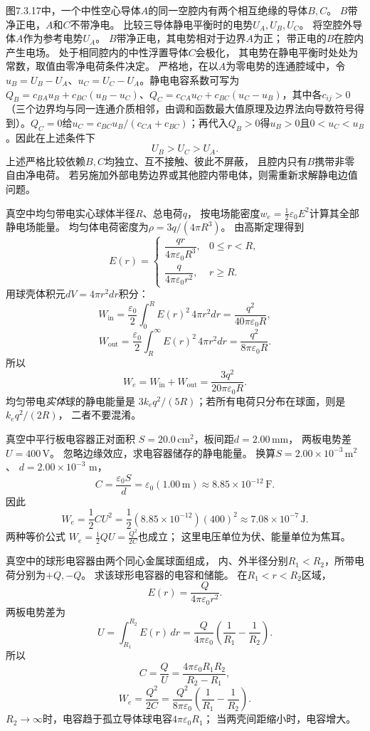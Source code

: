 \problemtext 图7.3.17中，一个中性空心导体$A$的同一空腔内有两个相互绝缘的导体$B,C$。
$B$带净正电，$A$和$C$不带净电。
比较三导体静电平衡时的电势$U_A,U_B,U_C$。
\workings
将空腔外导体$A$作为参考电势$U_A$。
$B$带净正电，其电势相对于边界$A$为正；
带正电的$B$在腔内产生电场。
处于相同腔内的中性浮置导体$C$会极化，
其电势在静电平衡时处处为常数，取值由零净电荷条件决定。
严格地，在以$A$为零电势的连通腔域中，令$u_B=U_B-U_A$、$u_C=U_C-U_A$。静电电容系数可写为$Q_B=c_{BA}u_B+c_{BC}(u_B-u_C)$、$Q_C=c_{CA}u_C+c_{BC}(u_C-u_B)$，其中各$c_{ij}>0$（三个边界均与同一连通介质相邻，由调和函数最大值原理及边界法向导数符号得到）。$Q_C=0$给$u_C=c_{BC}u_B/(c_{CA}+c_{BC})$；再代入$Q_B>0$得$u_B>0$且$0<u_C<u_B$。因此在上述条件下
\[
\boxed{U_B>U_C>U_A}.
\]
\crosscheck 上述严格比较依赖$B,C$均独立、互不接触、彼此不屏蔽，
且腔内只有$B$携带非零自由净电荷。
若另施加外部电势边界或其他腔内带电体，则需重新求解静电边值问题。

\problemtext 真空中均匀带电实心球体半径$R$、总电荷$q$，
按电场能密度$w_e=\tfrac12\varepsilon_0E^2$计算其全部静电场能量。
\workings
均匀体电荷密度为$\rho=3q/(4\pi R^3)$。
由高斯定理得到
\[
E(r)=
\begin{cases}
\dfrac{qr}{4\pi\varepsilon_0R^3},&0\le r<R,\\
\dfrac{q}{4\pi\varepsilon_0r^2},&r\ge R.
\end{cases}
\]
用球壳体积元$dV=4\pi r^2dr$积分：
\[
W_{\mathrm{in}}=\frac{\varepsilon_0}{2}
\int_0^R E(r)^2\,4\pi r^2dr
=\frac{q^2}{40\pi\varepsilon_0R},
\]
\[
W_{\mathrm{out}}=\frac{\varepsilon_0}{2}
\int_R^\infty E(r)^2\,4\pi r^2dr
=\frac{q^2}{8\pi\varepsilon_0R}.
\]
所以
\[
\boxed{W_e=W_{\mathrm{in}}+W_{\mathrm{out}}
=\frac{3q^2}{20\pi\varepsilon_0R}}.
\]
\crosscheck 均匀带电\emph{实体}球的静电能量是
$3k_eq^2/(5R)$；若所有电荷只分布在球面，则是$k_eq^2/(2R)$，
二者不要混淆。

\problemtext 真空中平行板电容器正对面积
$S=20.0\,\mathrm{cm^2}$，板间距$d=2.00\,\mathrm{mm}$，
两板电势差$U=400\,\mathrm V$。
忽略边缘效应，求电容器储存的静电能量。
\workings
换算$S=2.00\times10^{-3}\,\mathrm{m^2}$、
$d=2.00\times10^{-3}$ m，
\[
C=\frac{\varepsilon_0S}{d}
=\varepsilon_0(1.00\,\mathrm m)\approx8.85\times10^{-12}\,\mathrm F.
\]
因此
\[
\boxed{W_e=\frac12CU^2
=\frac12(8.85\times10^{-12})(400)^2
\approx7.08\times10^{-7}\,\mathrm J}.
\]
\crosscheck 两种等价公式
$W_e=\tfrac12 QU=\tfrac{Q^2}{2C}$也成立；
这里电压单位为伏、能量单位为焦耳。

\problemtext 真空中的球形电容器由两个同心金属球面组成，
内、外半径分别$R_1<R_2$，所带电荷分别为$+Q,-Q$。
求该球形电容器的电容和储能。
\workings
在$R_1<r<R_2$区域，
\[
E(r)=\frac{Q}{4\pi\varepsilon_0r^2}.
\]
两板电势差为
\[
U=\int_{R_1}^{R_2}E(r)\,dr
=\frac{Q}{4\pi\varepsilon_0}
\left(\frac1{R_1}-\frac1{R_2}\right).
\]
所以
\[
\boxed{C=\frac Q U
=\frac{4\pi\varepsilon_0R_1R_2}{R_2-R_1}},
\]
\[
\boxed{W_e=\frac{Q^2}{2C}
=\frac{Q^2}{8\pi\varepsilon_0}
\left(\frac1{R_1}-\frac1{R_2}\right)}.
\]
\crosscheck $R_2\to\infty$时，电容趋于孤立导体球电容$4\pi\varepsilon_0R_1$；
当两壳间距缩小时，电容增大。
